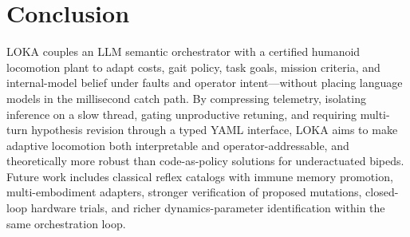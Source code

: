 \section{Conclusion}
\label{sec:conclusion}

LOKA couples an LLM semantic orchestrator with a certified humanoid locomotion plant to adapt costs, gait policy, task goals, mission criteria, and internal-model belief under faults and operator intent---without placing language models in the millisecond catch path.
By compressing telemetry, isolating inference on a slow thread, gating unproductive retuning, and requiring multi-turn hypothesis revision through a typed YAML interface, LOKA aims to make adaptive locomotion both interpretable and operator-addressable, and theoretically more robust than code-as-policy solutions for underactuated bipeds.
Future work includes classical reflex catalogs with immune memory promotion, multi-embodiment adapters, stronger verification of proposed mutations, closed-loop hardware trials, and richer dynamics-parameter identification within the same orchestration loop.
